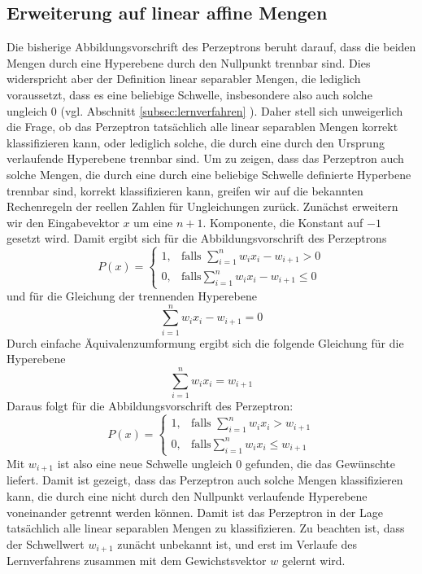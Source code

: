 \documentclass[fontsize=11pt]{scrartcl}
\begin{document}
            \subsection{Erweiterung auf linear affine Mengen}
                Die bisherige Abbildungsvorschrift des Perzeptrons beruht darauf, dass die beiden Mengen durch eine Hyperebene durch den Nullpunkt trennbar sind. Dies widerspricht aber der Definition linear separabler Mengen, die lediglich voraussetzt, dass es eine beliebige Schwelle, insbesondere also auch solche ungleich $0$ (vgl. Abschnitt \ref{subsec:lernverfahren} ). Daher stell sich unweigerlich die Frage, ob das Perzeptron tatsächlich alle linear separablen Mengen korrekt klassifizieren kann, oder lediglich solche, die durch eine durch den Ursprung verlaufende Hyperebene trennbar sind. Um zu zeigen, dass das Perzeptron auch solche Mengen, die durch eine durch eine beliebige Schwelle definierte Hyperbene trennbar sind, korrekt klassifizieren kann, greifen wir auf die bekannten Rechenregeln der reellen Zahlen für Ungleichungen zurück.
                Zunächst erweitern wir den Eingabevektor $x$ um eine $n+1$. Komponente, die Konstant auf $-1$ gesetzt wird.
                \newline 
                Damit ergibt sich für die Abbildungsvorschrift des Perzeptrons 
                $$
                    P(x)=\left\{\begin{array}{cl} 1, & \mbox{falls }\sum_{i=1}^nw_ix_i - w_{i+1} > 0\\ 0, & \mbox{falls} \sum_{i=1}^n w_ix_i - w_{i+1} \leq 0 \end{array}\right. 
                $$
                und für die Gleichung der trennenden Hyperebene
                $$
                    \sum_{i=1}^nw_ix_i - w_{i+1} = 0
                $$
                Durch einfache Äquivalenzumformung ergibt sich die folgende Gleichung für die Hyperebene
                    $$
                        \sum_{i=1}^nw_ix_i = w_{i+1}
                    $$
                    Daraus folgt für die Abbildungsvorschrift des Perzeptron:
                    $$
                    P(x)=\left\{\begin{array}{cl} 1, & \mbox{falls }\sum_{i=1}^nw_ix_i > w_{i+1}\\ 0, & \mbox{falls} \sum_{i=1}^n w_ix_i \leq w_{i+1} \end{array}\right. 
                    $$
                    Mit $w_{i+1}$ ist also eine neue Schwelle ungleich $0$ gefunden, die das Gewünschte liefert. Damit ist gezeigt, dass das Perzeptron auch solche Mengen klassifizieren kann, die durch eine nicht durch den Nullpunkt verlaufende Hyperebene voneinander getrennt werden können. Damit ist das Perzeptron in der Lage tatsächlich alle linear separablen Mengen zu klassifizieren.
                    \newline
                    Zu beachten ist, dass der Schwellwert $w_{i+1}$ zunächt unbekannt ist, und erst im Verlaufe des Lernverfahrens zusammen mit dem Gewichstsvektor $w$ gelernt wird.
                
\end{document}
